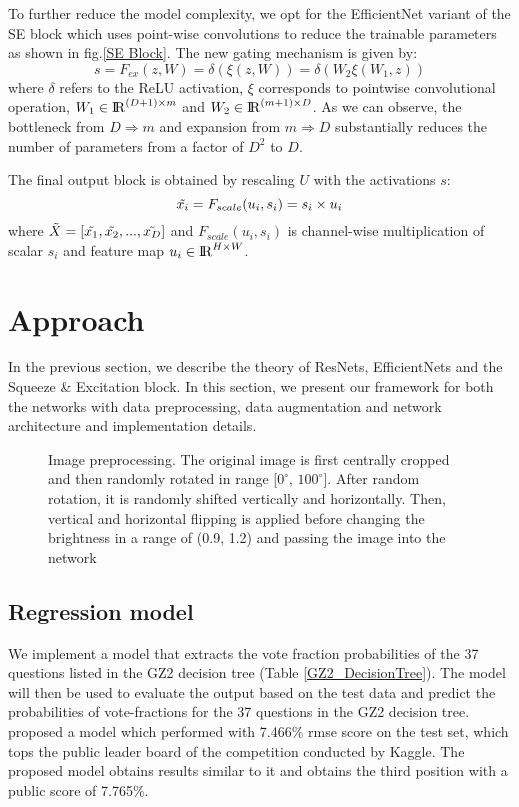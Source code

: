 \documentclass[fleqn,usenatbib]{mnras}
\begin{document}
To further reduce the model complexity, we opt for the EfficientNet variant of the SE block which uses point-wise convolutions to reduce the trainable parameters as shown in fig.\ref{SE Block}. The new gating mechanism is given by:
\begin{equation}
    s = F_{ex}(z, W) = \delta(\xi(z, W)) = \delta(W_2 \xi (W_1, z))
\end{equation}
where $\delta$ refers to the ReLU activation, $\xi$ corresponds to pointwise convolutional operation, $W_1 \in {\rm I\!R}^{(D+1) \times m}$ and $W_2 \in {\rm I\!R}^{(m+1) \times D}$. As we can observe, the bottleneck from $D \Rightarrow m$ and expansion from $m \Rightarrow D$ substantially reduces the number of parameters from a factor of $D^2$ to $D$.

The final output block is obtained by rescaling $U$ with the activations $s$:
\begin{equation}
    \Tilde{x_i} = F_{scale}(u_i,s_i) = s_i \times u_i
\end{equation}
where $\Tilde{X}=[\Tilde{x_1}, \Tilde{x_2}, ...,\Tilde{x_D}]$ and $F_{scale}(u_i,s_i)$ is channel-wise multiplication of scalar $s_i$ and feature map $u_i \in {\rm I\!R}^{H \times W}$.

\section{Approach}
\hspace{0.25 in}In the previous section, we describe the theory of ResNets, EfficientNets and the Squeeze \& Excitation block. In this section, we present our framework for both the networks with data preprocessing, data augmentation and network architecture and implementation details.
\begin{figure*}
    \centering
    
    \caption{Image preprocessing. The original image is first centrally cropped and then randomly rotated in range [$0^\circ$, $100^\circ$]. After random rotation, it is randomly shifted vertically and horizontally. Then, vertical and horizontal flipping is applied before changing the brightness in a range of (0.9, 1.2) and passing the image into the network}
    \label{fig: Data_augment}
\end{figure*}
\subsection{Regression model}
\hspace{0.25 in}We implement a model that extracts the vote fraction probabilities of the 37 questions listed in the GZ2 decision tree (Table \ref{GZ2_DecisionTree}). The model will then be used to evaluate the output based on the test data and predict the probabilities of vote-fractions for the 37 questions in the GZ2 decision tree. \citet{Dieleman2015} proposed a model which performed with 7.466\% rmse score on the test set, which tops the public leader board of the competition conducted by Kaggle. The proposed model obtains results similar to it and obtains the third position with a public score of 7.765\%. 
\end{document}
